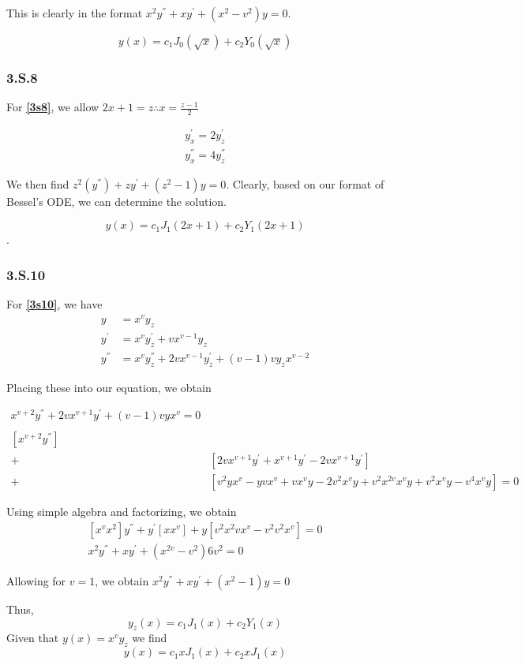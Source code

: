 \documentclass{article}
\begin{document}
This is clearly in the format $x^2y^{''}+xy^{'}+(x^2-v^2)y=0$.

$$y(x) = c_1 J_0 (\sqrt{x}) + c_2 Y_0 (\sqrt{x})$$
\par
\subsubsection*{3.S.8}

For \textbf{\eqref{3s8}}, we allow $2x+1=z \therefore x=\frac{z-1}{2}$

\begin{align*}
y_x^{'} = 2y_z^{'}\\
y_x^{''} = 4y_z^{''}
\end{align*}

We then find $z^2(y^{''})+zy^{'}+(z^2-1)y = 0$.
Clearly, based on our format of Bessel's ODE, we can determine the solution.

$$y(x) = c_1 J_1 (2x+1) + c_2 Y_1 (2x+1)$$.
\par
\subsubsection*{3.S.10}

For \textbf{\eqref{3s10}}, we have 
\begin{align*}
y &= x^vy_z\\
y^{'} &= x^vy_z^{'}+vx^{v-1}y_z\\
y^{''} &= x^vy_z^{''} + 2vx^{v-1}y_z^{'}+(v-1)vy_zx^{v-2}
\end{align*}

Placing these into our equation, we obtain

\begin{align*}
x^{v+2}y^{''} + 2vx^{v+1}y^{'} + (v-1)vyx^{v} = 0\\\\
\left[x^{v+2}y^{''}\right] & \\
+ &\left[2vx^{v+1}y^{'} + x^{v+1}y^{'} - 2vx^{v+1}y^{'} \right]\\
+ &\left[v^2yx^v - yvx^v + vx^vy - 2v^2x^vy + v^2x^{2v}x^vy + v^2x^vy - v^4x^vy \right] = 0
\end{align*}

Using simple algebra and factorizing, we obtain
\begin{align*}
\left[x^vx^2\right]y^{''}+y^{'}\left[xx^v\right]+y\left[v^2x^2vx^v-v^2v^2x^v\right] = 0\\
x^2y^{''}+xy^{'}+(x^{2v}-v^2)6v^2=0
\end{align*}

Allowing for $v=1$, we obtain $x^2y^{''}+xy^{'}+(x^2-1)y=0$

Thus,
\begin{equation*}
y_z(x) = c_1 J_1(x) + c_2 Y_1(x)
\end{equation*}
Given that $y(x) = x^v y_z$ we find
\begin{equation*}
y(x) = c_1 x J_1(x) + c_2 x J_1(x)
\end{equation*}
\end{document}
